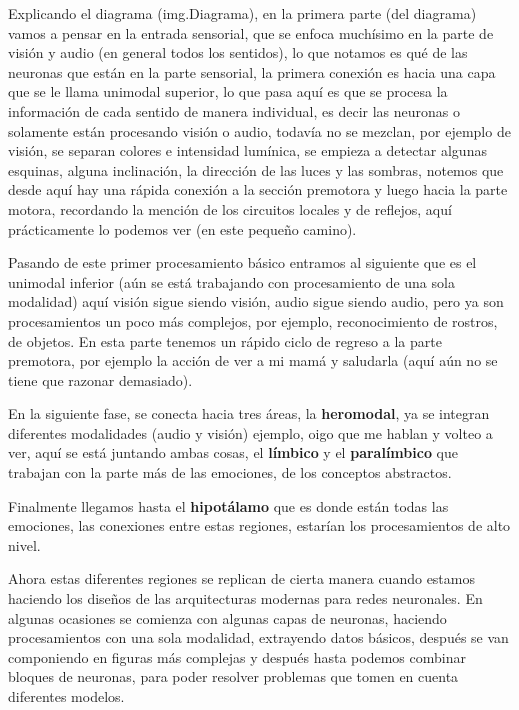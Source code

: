 Explicando el diagrama (img.Diagrama), en la primera parte (del diagrama) vamos a pensar en la entrada sensorial, que se enfoca muchísimo en la parte de visión y audio (en general todos los sentidos), lo que notamos es qué de las neuronas que están en la parte sensorial, la primera conexión es hacia una capa que se le llama unimodal superior, lo que pasa aquí es que se procesa la información de cada sentido de manera individual, es decir las neuronas o solamente están procesando visión o audio, todavía no se mezclan, por ejemplo de visión, se separan colores e intensidad lumínica, se empieza a detectar algunas esquinas, alguna inclinación, la dirección de las luces y las sombras, notemos que desde aquí hay una rápida conexión a la sección premotora y luego hacia la parte motora, recordando la mención de los circuitos locales y de reflejos, aquí prácticamente lo podemos ver (en este pequeño camino).

Pasando de este primer procesamiento básico entramos al siguiente que es el unimodal inferior (aún se está trabajando con procesamiento de una sola modalidad) aquí visión sigue
siendo visión, audio sigue siendo audio, pero ya son procesamientos un poco más
complejos, por ejemplo, reconocimiento de rostros, de objetos. En esta parte tenemos un rápido ciclo de regreso a la parte premotora, por ejemplo la acción de ver a mi mamá y saludarla (aquí aún no se tiene que razonar demasiado). 

En la siguiente fase, se conecta hacia tres áreas, la \textbf{heromodal}, ya se integran diferentes modalidades (audio y visión) ejemplo, oigo que me hablan y volteo a ver, aquí se está juntando ambas cosas, el \textbf{límbico} y el \textbf{paralímbico} que trabajan con la parte más de las emociones, de los conceptos abstractos.

Finalmente llegamos hasta el \textbf{hipotálamo} que es donde están todas las emociones, las conexiones entre estas regiones, estarían los procesamientos de alto nivel.

Ahora estas diferentes regiones se replican de cierta manera cuando estamos haciendo los diseños de las arquitecturas modernas para redes neuronales.
En algunas ocasiones se comienza con algunas capas de neuronas, haciendo procesamientos con una sola modalidad, extrayendo datos básicos, después se van
componiendo en figuras más complejas y después hasta podemos combinar bloques de neuronas, para poder resolver problemas que tomen en cuenta diferentes modelos.




